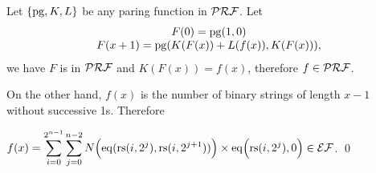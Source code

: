 \begin{pf} \rm
  Let $\{\mathrm{pg}, K, L\}$ be any paring function in $\mathcal{PRF}$. Let
\[
\begin{array}{c}
F(0) = \mathrm{pg}( 1, 0 ) \\
F(x + 1) = \mathrm{pg}(K(F(x)) + L(f(x)),  K(F(x))),
\end{array}
\]
we have $F$ is in $\mathcal{PRF}$ and $K(F(x)) = f(x)$, therefore $f\in\mathcal{PRF}$. 

On the other hand, 
$f(x)$ is the number of binary strings of length $x-1$ without successive 1s. Therefore

$\displaystyle f(x) = \sum_{i=0}^{2^{n-1}} \sum_{j = 0}^{n - 2}
N\Big(\mathrm{eq} ( \mathrm{rs}(i, 2^j) , \mathrm{rs}(i, 2^{j + 1}))\Big) \times
\mathrm{eq} \Big( \mathrm{rs}(i, 2^j) , 0 \Big) \in \mathcal{EF}$.
\qed
\end{pf}

